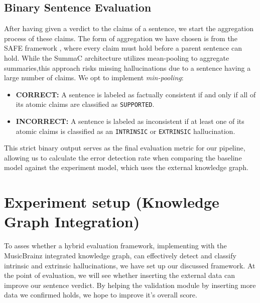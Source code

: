 \subsection{Binary Sentence Evaluation}
After having given a verdict to the claims of a sentence, we start the aggregation process of these claims. The form of aggregation we have chosen is from the SAFE framework \cite{safe2024longform}, where every claim must hold before a parent sentence can hold. While the SummaC \cite{laban2021summaC} architecture utilizes mean-pooling to aggregate summaries,this approach risks missing hallucinations due to a sentence having a large number of claims. We opt to implement \textit{min-pooling}: 

\begin{itemize}
    \item \textbf{CORRECT:} A sentence is labeled as factually consistent if and only if all of its atomic claims are classified as \texttt{SUPPORTED}.
    \item \textbf{INCORRECT:} A sentence is labeled as inconsistent if at least one of its atomic claims is classified as an \texttt{INTRINSIC} or \texttt{EXTRINSIC} hallucination.
\end{itemize}
This strict binary output serves as the final evaluation metric for our pipeline, allowing us to calculate the error detection rate when comparing the baseline model against the experiment model, which uses the external knowledge graph.


\newpage
\section{Experiment setup (Knowledge Graph Integration)}
To asses whether a hybrid evaluation framework, implementing \rob with the MusicBrainz integrated knowledge graph, can effectively detect and classify intrinsic and extrinsic hallucinations, we have set up our discussed framework. At the point of evaluation, we will see whether inserting the external data can improve our sentence verdict. By helping the validation module by inserting more data we confirmed holds, we hope to improve it's overall score. 

